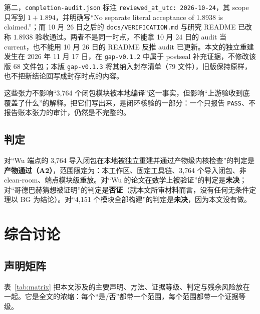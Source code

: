 \documentclass[11pt,a4paper]{ctexart}
\theoremstyle{plain}
\theoremstyle{definition}
\newcommand{\BG}{\mathrm{BG}}
\begin{document}
{\raggedright
第二，\texttt{completion-audit.json} 标注 \texttt{reviewed\_at\_utc: 2026-10-24}，其 scope 只写到 $1+1.894$，并明确写“No separate literal acceptance of 1.8938 is claimed.”；而 10 月 26 日之后的 \texttt{docs/VERIFICATION.md} 与研究 README 已改称 $1.8938$ 验收通过。两者不是同一时点，不能拿 10 月 24 日的 audit 当 current，也不能用 10 月 26 日的 README 反推 audit 已更新。本文的独立重建发生在 2026 年 11 月 17 日，在 \texttt{gap-v0.1.2} 中属于 postseal 补充证据，不修改该版 68 文件包；本版 \texttt{gap-v0.1.3} 将其纳入封存清单（79 文件），旧版保持原样，也不把新结论回写成封存时点的内容。
\par}

这些张力不影响“3,764 个闭包模块被本地编译”这一事实，但影响“上游验收到底覆盖了什么”的解释。把它们写出来，是闭环核验的一部分：一个只报告 \texttt{PASS}、不报告账本张力的审计，仍然是不完整的。

\subsection{判定}
\label{sec:wu-verdict}

对“Wu 端点的 3,764 导入闭包在本地被独立重建并通过产物级内核检查”的判定是\textbf{产物通过（A2）}，范围限定为：本工作区、固定工具链、3,764 个导入闭包、非 clean-room、端点模块级重放。对“Wu 的论文在数学上被验证”的判定是\textbf{未决}；对“哥德巴赫猜想被证明”的判定是\textbf{否证}（就本文所审材料而言，没有任何无条件定理以 $\BG$ 为结论）。对“4,151 个模块全部构建”的判定是\textbf{未决}，因为本文没有做。

\section{综合讨论}
\label{sec:synthesis}

\subsection{声明矩阵}
\label{sec:matrix}

表~\ref{tab:matrix} 把本文涉及的主要声明、方法、证据等级、判定与残余风险放在一起。它是全文的浓缩：每个“是/否”都带一个范围，每个范围都带一个证据等级。
\end{document}
